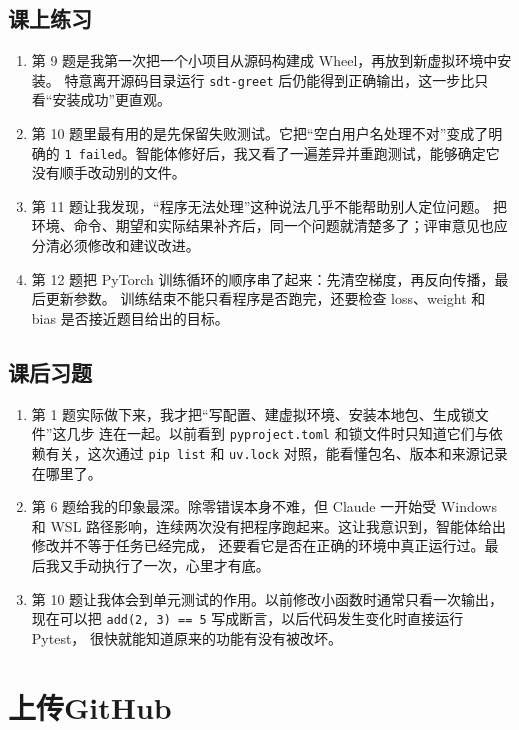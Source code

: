 \documentclass[a4paper,12pt]{report}
\begin{document}
\section{课上练习}
\begin{enumerate}
  \item {\large 第 9 题是我第一次把一个小项目从源码构建成 Wheel，再放到新虚拟环境中安装。
  特意离开源码目录运行 \texttt{sdt-greet} 后仍能得到正确输出，这一步比只看“安装成功”更直观。}
  \item {\large 第 10 题里最有用的是先保留失败测试。它把“空白用户名处理不对”变成了明确的
  \texttt{1 failed}。智能体修好后，我又看了一遍差异并重跑测试，能够确定它没有顺手改动别的文件。}
  \item {\large 第 11 题让我发现，“程序无法处理”这种说法几乎不能帮助别人定位问题。
  把环境、命令、期望和实际结果补齐后，同一个问题就清楚多了；评审意见也应分清必须修改和建议改进。}
  \item {\large 第 12 题把 PyTorch 训练循环的顺序串了起来：先清空梯度，再反向传播，最后更新参数。
  训练结束不能只看程序是否跑完，还要检查 loss、weight 和 bias 是否接近题目给出的目标。}
\end{enumerate}

\newpage
\section{课后习题}
\begin{enumerate}
  \item {\large 第 1 题实际做下来，我才把“写配置、建虚拟环境、安装本地包、生成锁文件”这几步
  连在一起。以前看到 \texttt{pyproject.toml} 和锁文件时只知道它们与依赖有关，这次通过
  \texttt{pip list} 和 \texttt{uv.lock} 对照，能看懂包名、版本和来源记录在哪里了。}
  \item {\large 第 6 题给我的印象最深。除零错误本身不难，但 Claude 一开始受 Windows 和 WSL
  路径影响，连续两次没有把程序跑起来。这让我意识到，智能体给出修改并不等于任务已经完成，
  还要看它是否在正确的环境中真正运行过。最后我又手动执行了一次，心里才有底。}
  \item {\large 第 10 题让我体会到单元测试的作用。以前修改小函数时通常只看一次输出，
  现在可以把 \texttt{add(2, 3) == 5} 写成断言，以后代码发生变化时直接运行 Pytest，
  很快就能知道原来的功能有没有被改坏。}
\end{enumerate}

\color{red}\chapter{上传GitHub}\color{black}
\end{document}
